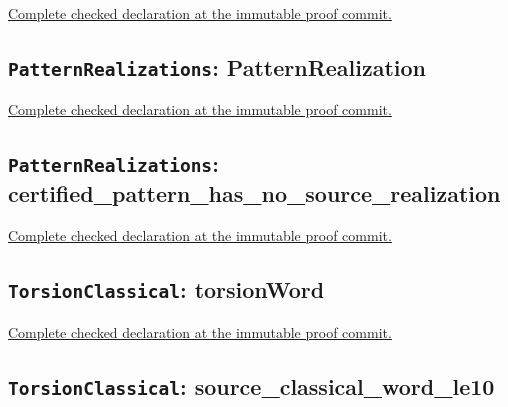 \noindent\href{https://github.com/alectionary/vibe-math/blob/3ae21c0719cedbd928f4f7882f9b9e266567605e/formalization/distance-preservation/truncated12/KernelCatalog.lean#L41-L57}{Complete checked declaration at the immutable proof commit.}



\subsection*{\texttt{PatternRealizations}: PatternRealization}

\noindent\href{https://github.com/alectionary/vibe-math/blob/3ae21c0719cedbd928f4f7882f9b9e266567605e/formalization/distance-preservation/truncated12/PatternRealizations.lean#L10-L21}{Complete checked declaration at the immutable proof commit.}



\subsection*{\texttt{PatternRealizations}: certified\_pattern\_has\_no\_source\_realization}

\noindent\href{https://github.com/alectionary/vibe-math/blob/3ae21c0719cedbd928f4f7882f9b9e266567605e/formalization/distance-preservation/truncated12/PatternRealizations.lean#L54-L72}{Complete checked declaration at the immutable proof commit.}



\subsection*{\texttt{TorsionClassical}: torsionWord}

\noindent\href{https://github.com/alectionary/vibe-math/blob/3ae21c0719cedbd928f4f7882f9b9e266567605e/formalization/distance-preservation/truncated12/TorsionClassical.lean#L17-L19}{Complete checked declaration at the immutable proof commit.}



\subsection*{\texttt{TorsionClassical}: source\_classical\_word\_le10}

